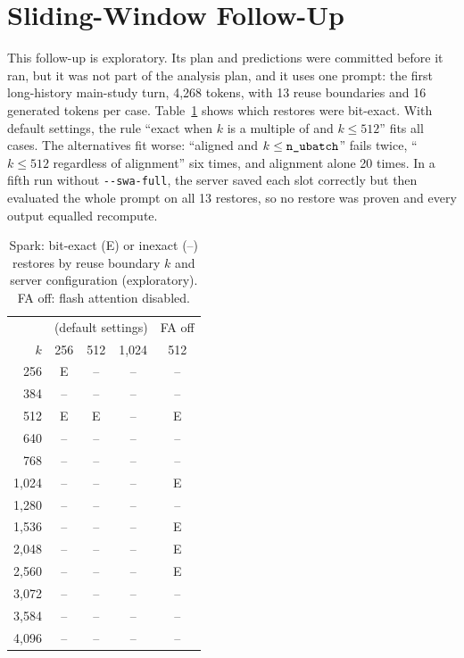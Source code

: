 \section{Sliding-Window Follow-Up}
\label{app:spark}

This follow-up is exploratory. Its plan and predictions were committed before
it ran, but it was not part of the analysis plan, and it uses one prompt:
the first long-history main-study turn, 4{,}268 tokens, with 13 reuse
boundaries and 16 generated tokens per case. Table~\ref{tab:sparkgrid} shows
which restores were bit-exact. With default settings, the rule ``exact when
$k$ is a multiple of \nub{} and $k \leq 512$'' fits all \SparkCases{} cases.
The alternatives fit worse: ``aligned and $k \leq \texttt{n\_ubatch}$'' fails twice,
``$k \leq 512$ regardless of alignment'' six times, and alignment alone 20
times. In a fifth run without \texttt{-{}-swa-full}, the server saved each slot
correctly but then evaluated the whole prompt on all 13 restores, so no restore
was proven and every output equalled recompute.

\begin{table}[h]
\caption{Spark: bit-exact (E) or inexact (--) restores by reuse boundary $k$
and server configuration (exploratory). FA off: flash attention disabled.}
\label{tab:sparkgrid}
\small
\begin{tabular}{@{}rcccc@{}}
\toprule
 & \multicolumn{3}{c}{\nub{} (default settings)} & FA off \\
$k$ & 256 & 512 & 1{,}024 & 512 \\
\midrule
256 & E & -- & -- & -- \\
384 & -- & -- & -- & -- \\
512 & E & E & -- & E \\
640 & -- & -- & -- & -- \\
768 & -- & -- & -- & -- \\
1{,}024 & -- & -- & -- & E \\
1{,}280 & -- & -- & -- & -- \\
1{,}536 & -- & -- & -- & E \\
2{,}048 & -- & -- & -- & E \\
2{,}560 & -- & -- & -- & E \\
3{,}072 & -- & -- & -- & -- \\
3{,}584 & -- & -- & -- & -- \\
4{,}096 & -- & -- & -- & -- \\
\bottomrule
\end{tabular}
\end{table}

